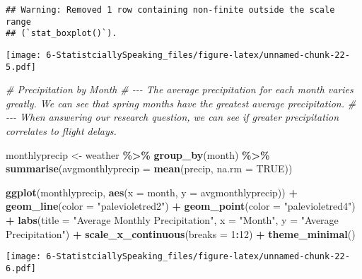\documentclass[
]{article}
\newenvironment{Shaded}{\begin{snugshade}}{\end{snugshade}}
\newcommand{\AttributeTok}[1]{\textcolor[rgb]{0.13,0.29,0.53}{#1}}
\newcommand{\CommentTok}[1]{\textcolor[rgb]{0.56,0.35,0.01}{\textit{#1}}}
\newcommand{\ConstantTok}[1]{\textcolor[rgb]{0.56,0.35,0.01}{#1}}
\newcommand{\DecValTok}[1]{\textcolor[rgb]{0.00,0.00,0.81}{#1}}
\newcommand{\FunctionTok}[1]{\textcolor[rgb]{0.13,0.29,0.53}{\textbf{#1}}}
\newcommand{\NormalTok}[1]{#1}
\newcommand{\OtherTok}[1]{\textcolor[rgb]{0.56,0.35,0.01}{#1}}
\newcommand{\SpecialCharTok}[1]{\textcolor[rgb]{0.81,0.36,0.00}{\textbf{#1}}}
\newcommand{\StringTok}[1]{\textcolor[rgb]{0.31,0.60,0.02}{#1}}
\begin{document}
\begin{verbatim}
## Warning: Removed 1 row containing non-finite outside the scale range
## (`stat_boxplot()`).
\end{verbatim}

\texttt{[image: 6-StatistciallySpeaking\_files/figure-latex/unnamed-chunk-22-5.pdf]}

\begin{Shaded}
\begin{Highlighting}[]
\CommentTok{\# Precipitation by Month}
\CommentTok{\# {-}{-}{-} The average precipitation for each month varies greatly. We can see that spring months have the greatest average precipitation.}
\CommentTok{\# {-}{-}{-} When answering our research question, we can see if greater precipitation correlates to flight delays. }

\NormalTok{monthlyprecip }\OtherTok{\textless{}{-}}\NormalTok{ weather }\SpecialCharTok{\%\textgreater{}\%}
  \FunctionTok{group\_by}\NormalTok{(month) }\SpecialCharTok{\%\textgreater{}\%}
  \FunctionTok{summarise}\NormalTok{(}\AttributeTok{avgmonthlyprecip =} \FunctionTok{mean}\NormalTok{(precip, }\AttributeTok{na.rm =} \ConstantTok{TRUE}\NormalTok{))}

\FunctionTok{ggplot}\NormalTok{(monthlyprecip, }\FunctionTok{aes}\NormalTok{(}\AttributeTok{x =}\NormalTok{ month, }\AttributeTok{y =}\NormalTok{ avgmonthlyprecip)) }\SpecialCharTok{+}
  \FunctionTok{geom\_line}\NormalTok{(}\AttributeTok{color =} \StringTok{"palevioletred2"}\NormalTok{) }\SpecialCharTok{+}
  \FunctionTok{geom\_point}\NormalTok{(}\AttributeTok{color =} \StringTok{"palevioletred4"}\NormalTok{) }\SpecialCharTok{+}
  \FunctionTok{labs}\NormalTok{(}\AttributeTok{title =} \StringTok{"Average Monthly Precipitation"}\NormalTok{,}
       \AttributeTok{x =} \StringTok{"Month"}\NormalTok{,}
       \AttributeTok{y =} \StringTok{"Average Precipitation"}\NormalTok{) }\SpecialCharTok{+}
  \FunctionTok{scale\_x\_continuous}\NormalTok{(}\AttributeTok{breaks =} \DecValTok{1}\SpecialCharTok{:}\DecValTok{12}\NormalTok{) }\SpecialCharTok{+}
  \FunctionTok{theme\_minimal}\NormalTok{()}
\end{Highlighting}
\end{Shaded}

\texttt{[image: 6-StatistciallySpeaking\_files/figure-latex/unnamed-chunk-22-6.pdf]}

\begin{Shaded}
\end{Shaded}
\end{document}
